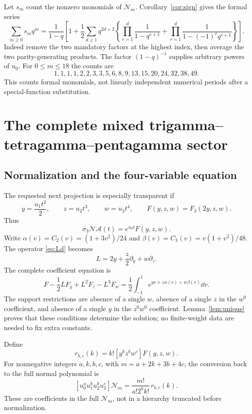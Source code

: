 \documentclass[11pt,letterpaper]{article}
\numberwithin{equation}{section}
\theoremstyle{plain}
\theoremstyle{definition}
\theoremstyle{remark}
\newcommand{\Ac}{\mathcal A}\newcommand{\Nc}{\mathcal N}\newcommand{\Hc}{\mathcal H}
\begin{document}
Let $s_m$ count the nonzero monomials of $\Nc_m$. Corollary~\ref{cor:sign} gives the formal series
\begin{equation}\label{eq:support-series}
 \sum_{m\ge0}s_mq^m=
 \frac1{1-q}\left[1+\frac12\sum_{d\ge1}q^{2d+2}
 \left\{\prod_{r=1}^d\frac1{1-q^{r+1}}+
        \prod_{r=1}^d\frac1{1-(-1)^rq^{r+1}}\right\}\right].
\end{equation}
Indeed remove the two mandatory factors at the highest index, then average the two parity-generating products. The factor $(1-q)^{-1}$ supplies arbitrary powers of $u_0$. For $0\le m\le18$ the counts are
\[
 1,1,1,1,2,2,3,3,5,6,8,9,13,15,20,24,32,38,49.
\]
This counts formal monomials, not linearly independent numerical periods after a special-function substitution.



\section{The complete mixed trigamma--tetragamma--pentagamma sector}
\label{sec:mixed}

\subsection{Normalization and the four-variable equation}

The requested next projection is especially transparent if
\begin{equation}\label{eq:xyz}
 y=\frac{u_1t^2}{2},\qquad z=u_2t^3,\qquad w=u_3t^4,
 \qquad F(y,z,w)=F_3(2y,z,w).
\end{equation}
Thus
\[
 \sigma_3\Nc\Ac(t)=e^{u_0t}F(y,z,w).
\]
Write $\alpha(v)=C_2(v)=(1+3v^2)/24$ and
$\beta(v)=C_3(v)=v(1+v^2)/48$. The operator \eqref{eq:Ld} becomes
\[
 L=2y+\frac z2\partial_y+w\partial_z.
\]
The complete coefficient equation is
\begin{equation}\label{eq:fourPDE}
 \boxed{\displaystyle
 F-\frac12LF_y+L^2F_z-L^3F_w
 =\frac12\int_{-1}^1e^{yv+z\alpha(v)+w\beta(v)}\dd v.}
\end{equation}
The support restrictions are absence of a single $w$, absence of a single $z$ in the $w^0$ coefficient, and absence of a single $y$ in the $z^0w^0$ coefficient. Lemma~\ref{lem:unique} proves that these conditions determine the solution; no finite-weight data are needed to fix extra constants.

Define
\begin{equation}\label{eq:rdef}
 r_{b,c}(k)=k![y^kz^bw^c]F(y,z,w).
\end{equation}
For nonnegative integers $a,k,b,c$, with $m=a+2k+3b+4c$, the conversion back to the full normal polynomial is
\begin{equation}\label{eq:r-to-coeff}
 [u_0^au_1^ku_2^bu_3^c]\Nc_m
 =\frac{m!}{a!2^kk!}\,r_{b,c}(k).
\end{equation}
These are coefficients in the full $\Nc_m$, not in a hierarchy truncated before normalization.
\end{document}
